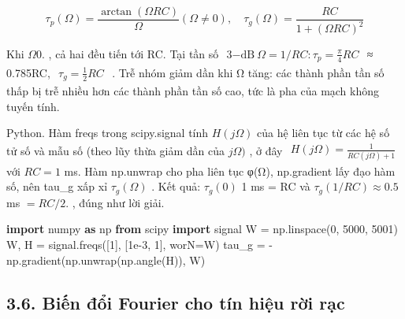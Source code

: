 \documentclass[
  10
]{article}
\newenvironment{Shaded}{}{}
\newcommand{\DecValTok}[1]{\textcolor[rgb]{0.25,0.63,0.44}{#1}}
\newcommand{\FloatTok}[1]{\textcolor[rgb]{0.25,0.63,0.44}{#1}}
\newcommand{\ImportTok}[1]{\textcolor[rgb]{0.00,0.50,0.00}{\textbf{#1}}}
\newcommand{\NormalTok}[1]{#1}
\newcommand{\OperatorTok}[1]{\textcolor[rgb]{0.40,0.40,0.40}{#1}}
\begin{document}
\[
\tau_ {p} (\Omega) = \frac {\arctan (\Omega R C)}{\Omega} (\Omega \neq 0), \quad \tau_ {g} (\Omega) = \frac {R C}{1 + (\Omega R C) ^ {2}}
\]

Khi \(\Omega  0 .\) , cả hai đều tiến tới RC. Tại tần số
\(\begin{array} { r } { 3 \mathrm { - d B } \ \Omega = 1 / R C \colon \tau _ { p } = \frac { \pi } { 4 } R C } \end{array}\)
≈ 0.785RC,
\(\begin{array} { r } { \tau _ { g } = \frac { 1 } { 2 } R C } \end{array}\)
. Trễ nhóm giảm dần khi Ω tăng: các thành phần tần số thấp bị trễ nhiều
hơn các thành phần tần số cao, tức là pha của mạch không tuyến tính. 

Python. Hàm freqs trong scipy.signal tính \(H ( j \Omega )\) của hệ liên
tục từ các hệ số tử số và mẫu số (theo lũy thừa giảm dần của
\(j \Omega )\) , ở đây
\(\begin{array} { r } { H ( j \Omega ) = \frac { 1 } { R C ( j \Omega ) + 1 } } \end{array}\)
với \(R C = 1\) ms. Hàm np.unwrap cho pha liên tục φ(Ω), np.gradient lấy
đạo hàm số, nên tau\_g xấp xỉ \(\tau _ { g } ( \Omega )\) . Kết quả:
\(\tau _ { g } ( 0 )\) 1 ms = RC và
\(\tau _ { g } ( 1 / R C ) \approx 0 . 5\) ms \(= R C / 2 .\) , đúng như
lời giải.

\begin{Shaded}
\begin{Highlighting}[]
\ImportTok{import}\NormalTok{ numpy }\ImportTok{as}\NormalTok{ np}
\ImportTok{from}\NormalTok{ scipy }\ImportTok{import}\NormalTok{ signal}
\NormalTok{W }\OperatorTok{=}\NormalTok{ np.linspace(}\DecValTok{0}\NormalTok{, }\DecValTok{5000}\NormalTok{, }\DecValTok{5001}\NormalTok{)}
\NormalTok{W, H }\OperatorTok{=}\NormalTok{ signal.freqs([}\DecValTok{1}\NormalTok{], [}\FloatTok{1e{-}3}\NormalTok{, }\DecValTok{1}\NormalTok{], worN}\OperatorTok{=}\NormalTok{W)}
\NormalTok{tau\_g }\OperatorTok{=} \OperatorTok{{-}}\NormalTok{np.gradient(np.unwrap(np.angle(H)), W) }
\end{Highlighting}
\end{Shaded}

\subsection{3.6. Biến đổi Fourier cho tín hiệu rời
rạc}\label{biux1ebfn-ux111ux1ed5i-fourier-cho-tuxedn-hiux1ec7u-rux1eddi-rux1ea1c}
\end{document}
